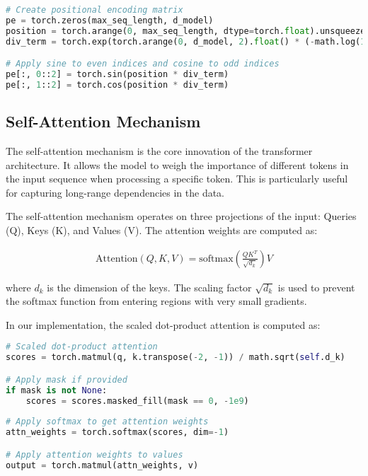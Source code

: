 \documentclass{article}
\begin{document}
\begin{lstlisting}[language=Python, caption=Positional Encoding Implementation]
# Create positional encoding matrix
pe = torch.zeros(max_seq_length, d_model)
position = torch.arange(0, max_seq_length, dtype=torch.float).unsqueeze(1)
div_term = torch.exp(torch.arange(0, d_model, 2).float() * (-math.log(10000.0) / d_model))

# Apply sine to even indices and cosine to odd indices
pe[:, 0::2] = torch.sin(position * div_term)
pe[:, 1::2] = torch.cos(position * div_term)
\end{lstlisting}

\subsection{Self-Attention Mechanism}

The self-attention mechanism is the core innovation of the transformer architecture. It allows the model to weigh the importance of different tokens in the input sequence when processing a specific token. This is particularly useful for capturing long-range dependencies in the data.

The self-attention mechanism operates on three projections of the input: Queries (Q), Keys (K), and Values (V). The attention weights are computed as:

\begin{align}
\text{Attention}(Q, K, V) = \text{softmax}\left(\frac{QK^T}{\sqrt{d_k}}\right)V
\end{align}

where $d_k$ is the dimension of the keys. The scaling factor $\sqrt{d_k}$ is used to prevent the softmax function from entering regions with very small gradients.

In our implementation, the scaled dot-product attention is computed as:

\begin{lstlisting}[language=Python, caption=Scaled Dot-Product Attention]
# Scaled dot-product attention
scores = torch.matmul(q, k.transpose(-2, -1)) / math.sqrt(self.d_k)

# Apply mask if provided
if mask is not None:
    scores = scores.masked_fill(mask == 0, -1e9)
    
# Apply softmax to get attention weights
attn_weights = torch.softmax(scores, dim=-1)

# Apply attention weights to values
output = torch.matmul(attn_weights, v)
\end{lstlisting}
\end{document}
